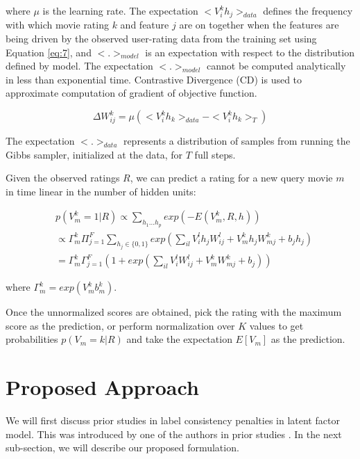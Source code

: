 \documentclass[conference]{IEEEtran}
\begin{document}
  where $\mu$ is the learning rate. The expectation $<V_i^kh_j>_{data}$ defines the frequency with which movie rating $k$ and feature $j$ are on together when the features are being driven by the observed user-rating data from the training set using Equation \ref{eq:7}, and $<.>_{model}$ is an expectation with respect to the distribution defined by model. The expectation $<.>_{model}$ cannot be computed analytically in less than exponential time. Contrastive Divergence (CD) \cite{pmlr-v9-sutskever10a} is used to approximate computation of gradient of objective function.

  \begin{equation}
    \Delta W_{ij}^k = \mu (<V_i^kh_k>_{data} - <V_i^kh_k>_T)
    \label{eq:9}
  \end{equation}

  The expectation $<.>_{data}$ represents a distribution of samples from running the Gibbs sampler, initialized at the data, for $T$ full steps.

  Given the observed ratings $R$, we can predict a rating for a new query movie $m$ in time linear in the number of hidden units:

  \begin{align}
    & p(V_m^k=1|R)  \propto \sum_{h_1\dots h_p} exp(-E(V_m^k,R,h)) \nonumber \\
    &              \propto \Gamma_m^k \Pi_{j=1}^F \sum_{h_j \in \{0,1\}} exp(\sum_{il}V_i^lh_jW_{ij}^l + V_m^kh_jW_{mj}^k + b_jh_j) \nonumber \\
    &              = \Gamma_m^k \Gamma_{j=1}^F (1+exp(\sum_{il}V_i^lW_{ij}^l+V_m^kW_{mj}^k+b_j)) 
                 \label{eq:10}
  \end{align}

  where $\Gamma_m^k = exp(V_m^kb_m^k)$. 

  Once the unnormalized scores are obtained, pick the rating with the maximum score as the prediction, or perform normalization over $K$ values to get probabilities $p(V_m=k|R)$ and take the expectation $E[V_m]$ as the prediction.

\section{Proposed Approach} 

  We will first discuss prior studies in label consistency penalties in latent factor model. This was introduced by one of the authors in prior studies \cite{gogna2016supervised}. In the next sub-section, we will describe our proposed formulation.
\end{document}
